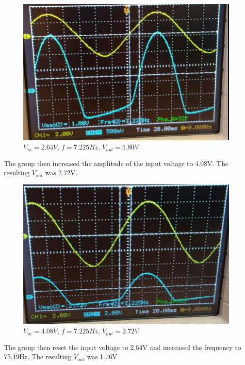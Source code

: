 \documentclass[twocolumn, amsmath]{revtex4}
\begin{document}
\begin{figure}[h]
    \includegraphics[scale=0.4]{1800mV.png}  
    \caption{$V_{in}= 2.64V$, $f=7.225Hz$, $V_{out} = 1.80V$}
\end{figure}


The group then increased the amplitude of the input voltage to 4.08V. The resulting $V_{out}$ was 2.72V.

\begin{figure}[h]
    \includegraphics[scale=0.45]{2720mV.png}  
    \caption{$V_{in}= 4.08V$, $f=7.225Hz$, $V_{out}= 2.72V$}
\end{figure}


The group then reset the input voltage to 2.64V and increased the frequency to 75.19Hz. The resulting $V_{out}$ was 1.76V
\end{document}
